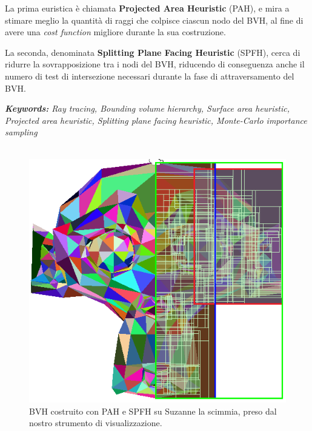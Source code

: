 \documentclass{PoliMi_MasterThesis}
\begin{document}
La prima euristica è chiamata \textbf{Projected Area Heuristic} (PAH), e mira a stimare meglio la quantità di raggi che colpisce ciascun nodo del BVH, al fine di avere una \textit{cost function} migliore durante la sua costruzione.

La seconda, denominata \textbf{Splitting Plane Facing Heuristic} (SPFH), cerca di ridurre la sovrapposizione tra i nodi del BVH, riducendo di conseguenza anche il numero di test di intersezione necessari durante la fase di attraversamento del BVH.

\small
\textit{\textbf{Keywords:} Ray tracing, Bounding volume hierarchy, Surface area heuristic, Projected area heuristic, Splitting plane facing heuristic, Monte-Carlo importance sampling}
\normalsize
\\\\
\begin{figure}[H]
    \centering
    \includegraphics[width=\textwidth*\real{0.5}]{Images/abstract_image.png}
	\caption{BVH costruito con PAH e SPFH su Suzanne la scimmia, preso dal nostro strumento di visualizzazione.}
\end{figure}

\thispagestyle{empty}
\tableofcontents %
\thispagestyle{empty}
\cleardoublepage

\mainmatter %
\end{document}
